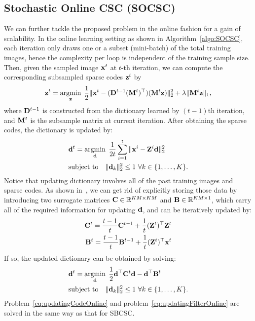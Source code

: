 \subsection{Stochastic Online CSC (SOCSC)}
We can further tackle the proposed problem in the online fashion for a gain of scalability. In the online learning setting as shown in Algorithm~\ref{algo:SOCSC}, each iteration only draws one or a subset (mini-batch) of the total training images, hence the complexity per loop is independent of the training sample size. Then, given the sampled image $\signal^t$ at $t$-th iteration, we can compute the corresponding subsampled sparse codes $\code^t$ by
\begin{equation} \label{eq:updatingCodeOnline}
    \code^t = \minimize{\code} \frac{1}{2}\|\signal^t - (\Filter^{t-1} (\mask^t)^\top)(\mask^t \code) \|_2^2 + \lambda \|\mask^t \code\|_1,
\end{equation}
where $\Filter^{t-1}$ is constructed from the dictionary learned by $(t-1)$th iteration, and $\mask^t$ is the subsample matrix at current iteration. After obtaining the sparse codes, the dictionary is updated by:
\begin{equation}
\begin{split}
    &\filter^t = \minimize{\filter} \frac{1}{2t}\sum_{i=1}^{t} \|\signal^i - \Code^i \filter \|_2^2 \\
    &\text{subject to} \quad \|\filter_k\|^2_2 \leq 1 ~ \forall k \in \{1,\dots,K\}.
\end{split}
\end{equation}
Notice that updating dictionary involves all of the past training images and sparse codes. As shown in~\cite{mairal2009online,mairal2010online}, we can get rid of explicitly storing those data by introducing two surrogate matrices $\surC \in \mathbb{R}^{KM \times KM}$ and $\surB \in \mathbb{R}^{KM \times 1}$, which carry all of the required information for updating $\filter$, and can be iteratively updated by:
\begin{equation} \label{eq:updateSur}
\begin{split}
    \surC^t  = \frac{t-1}{t} \surC^{t-1} + \frac{1}{t}(\Code^t)^\top \Code^t \\
    \surB^t  = \frac{t-1}{t} \surB^{t-1} + \frac{1}{t}(\Code^t)^\top \signal^t
\end{split}
\end{equation}
If so, the updated dictionary can be obtained by solving:
\begin{equation} \label{eq:updatingFilterOnline}
\begin{split}
    & \filter^t = \minimize{\filter} \frac{1}{2} \filter^\top \surC^t\filter - \filter^\top \surB^t \\& \text{subject to} \quad \|\filter_k\|_2^2 \leq 1 ~ \forall k \in \{1,\dots,K\}.
\end{split}
\end{equation}
Problem~\ref{eq:updatingCodeOnline} and problem~\ref{eq:updatingFilterOnline} are solved in the same way as that for SBCSC.

